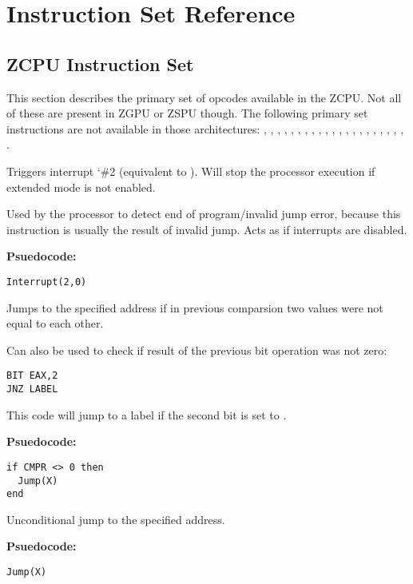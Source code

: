 \chapter{Instruction Set Reference} \label{opcodelist}
\section{ZCPU Instruction Set}
This section describes the primary set of opcodes available in the ZCPU. Not all of these are present in ZGPU or ZSPU though. The following primary set instructions are not available in those architectures: , , , , , , , , , , , , , , , , , , , , , .


Triggers interrupt \char`\#2 (equivalent to ). Will stop the processor execution if extended mode is not enabled.

Used by the processor to detect end of program/invalid jump error, because this instruction is usually the result of invalid jump. Acts as  if interrupts are disabled.

\textbf{Psuedocode:}
\begin{verbatim}
Interrupt(2,0)
\end{verbatim}


Jumps to the specified address if in previous comparsion two values were not equal to each other.

Can also be used to check if result of the previous bit operation was not zero:
\begin{verbatim}
BIT EAX,2
JNZ LABEL
\end{verbatim}

This code will jump to a label if the second bit is set to .


\textbf{Psuedocode:}
\begin{verbatim}
if CMPR <> 0 then
  Jump(X)
end
\end{verbatim}


Unconditional jump to the specified address.


\textbf{Psuedocode:}
\begin{verbatim}
Jump(X)
\end{verbatim}


